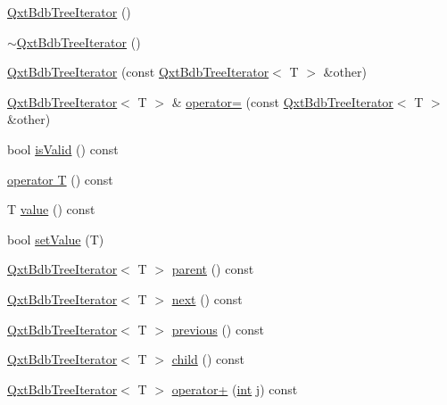 \begin{DoxyCompactItemize}
\item 
\hyperlink{class_qxt_bdb_tree_iterator_ade3817339427535c64b39e21dd907fc7}{Qxt\-Bdb\-Tree\-Iterator} ()
\item 
\hyperlink{class_qxt_bdb_tree_iterator_affdde181a957f478bdfab78c752ca959}{$\sim$\-Qxt\-Bdb\-Tree\-Iterator} ()
\item 
\hyperlink{class_qxt_bdb_tree_iterator_a17b1e991a6c18e319411b75da9d520b0}{Qxt\-Bdb\-Tree\-Iterator} (const \hyperlink{class_qxt_bdb_tree_iterator}{Qxt\-Bdb\-Tree\-Iterator}$<$ T $>$ \&other)
\item 
\hyperlink{class_qxt_bdb_tree_iterator}{Qxt\-Bdb\-Tree\-Iterator}$<$ T $>$ \& \hyperlink{class_qxt_bdb_tree_iterator_ac2483a96e15b3810622c324504789117}{operator=} (const \hyperlink{class_qxt_bdb_tree_iterator}{Qxt\-Bdb\-Tree\-Iterator}$<$ T $>$ \&other)
\item 
bool \hyperlink{class_qxt_bdb_tree_iterator_aac782b406552cbfea15fff75c0db60fe}{is\-Valid} () const 
\item 
\hyperlink{class_qxt_bdb_tree_iterator_a6a48808acef8a601f7376dbb94fcc06b}{operator T} () const 
\item 
T \hyperlink{class_qxt_bdb_tree_iterator_ad863436017b87f99307bb84d18887536}{value} () const 
\item 
bool \hyperlink{class_qxt_bdb_tree_iterator_ab44488ffd1d987dd0c054d84918ec4ec}{set\-Value} (T)
\item 
\hyperlink{class_qxt_bdb_tree_iterator}{Qxt\-Bdb\-Tree\-Iterator}$<$ T $>$ \hyperlink{class_qxt_bdb_tree_iterator_a3193a686508549dea0d169d7cd1099ae}{parent} () const 
\item 
\hyperlink{class_qxt_bdb_tree_iterator}{Qxt\-Bdb\-Tree\-Iterator}$<$ T $>$ \hyperlink{class_qxt_bdb_tree_iterator_a1fbedd0b6d710c7b999477a51ebbcdc8}{next} () const 
\item 
\hyperlink{class_qxt_bdb_tree_iterator}{Qxt\-Bdb\-Tree\-Iterator}$<$ T $>$ \hyperlink{class_qxt_bdb_tree_iterator_ae284739ef9e3f009b900723d6f581bc0}{previous} () const 
\item 
\hyperlink{class_qxt_bdb_tree_iterator}{Qxt\-Bdb\-Tree\-Iterator}$<$ T $>$ \hyperlink{class_qxt_bdb_tree_iterator_a300c2f5e494b3c784aca5dfd2f70ce42}{child} () const 
\item 
\hyperlink{class_qxt_bdb_tree_iterator}{Qxt\-Bdb\-Tree\-Iterator}$<$ T $>$ \hyperlink{class_qxt_bdb_tree_iterator_af870acf3290bf49866c13aa7d84faa2d}{operator+} (\hyperlink{ioapi_8h_a787fa3cf048117ba7123753c1e74fcd6}{int} j) const 

\end{DoxyCompactItemize}
